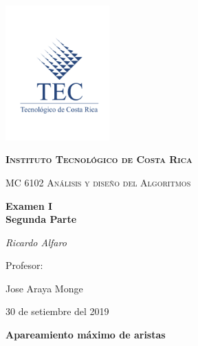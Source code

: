 \documentclass[12pt,a4paper]{article}
\begin{document}
\begin{titlepage}
	\centering
	\includegraphics[width=0.30\textwidth]{Teclogocompleto.jpg}\par\vspace{1cm}
	{\scshape\large \textbf{Instituto Tecnológico de Costa Rica }\par}
	\vspace{1cm}
	{\scshape\Large MC 6102 Análisis y diseño del Algoritmos\par}
	\vspace{1.5cm}
	{\Large\bfseries Examen I\\Segunda Parte\par}
	\vspace{2cm}
	{\Large\itshape Ricardo Alfaro\par}
	\vfill
	Profesor:\par
	Jose Araya Monge\textsc{}

	\vfill

	{\large 30 de setiembre del 2019\par}
\end{titlepage}

\begin{center}
\LARGE \textbf {Apareamiento máximo de aristas}
\end{center}
\end{document}
